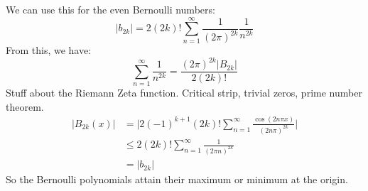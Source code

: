 \documentclass[crop=false,class=book,oneside]{standalone}
\begin{document}
            We can use this for the even Bernoulli numbers:
            \begin{equation}
                |b_{2k}|=2(2k)!\sum_{n=1}^{\infty}
                    \frac{1}{(2\pi)^{2k}}\frac{1}{n^{2k}}
            \end{equation}
            From this, we have:
            \begin{equation}
                \sum_{n=1}^{\infty}\frac{1}{n^{2k}}
                =\frac{(2\pi)^{2k}|B_{2k}|}{2(2k)!}
            \end{equation}
            Stuff about the Riemann Zeta function. Critical strip,
            trivial zeros, prime number theorem.
            \begin{align}
                |B_{2k}(x)|&=
                    \Big|2(-1)^{k+1}(2k)!\sum_{n=1}^{\infty}
                    \frac{\cos(2n\pi{x})}{(2n\pi)^{2k}}\Big|\\
                    &\leq2(2k)!\sum_{n=1}^{\infty}\frac{1}{(2\pi{n})^{2k}}\\
                    &=|b_{2k}|
            \end{align}
            So the Bernoulli polynomials attain their maximum or minimum
            at the origin.
\end{document}
